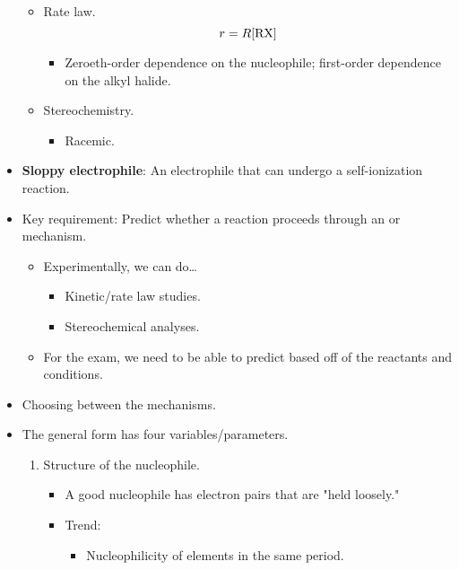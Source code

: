 \documentclass[../notes.tex]{subfiles}
\begin{document}
\begin{itemize}
\begin{itemize}
\begin{itemize}
        \end{itemize}
        \item Rate law.
        \begin{equation*}
            r = R[\ce{RX}]
        \end{equation*}
        \begin{itemize}
            \item Zeroeth-order dependence on the nucleophile; first-order dependence on the alkyl halide.
        \end{itemize}
        \item Stereochemistry.
        \begin{itemize}
            \item Racemic.
        \end{itemize}
    \end{itemize}
    \item \textbf{Sloppy electrophile}: An electrophile that can undergo a self-ionization reaction.
    \item Key requirement: Predict whether a reaction proceeds through an  or  mechanism.
    \begin{itemize}
        \item Experimentally, we can do\dots
        \begin{itemize}
            \item Kinetic/rate law studies.
            \item Stereochemical analyses.
        \end{itemize}
        \item For the exam, we need to be able to predict based off of the reactants and conditions.
    \end{itemize}
    \item Choosing between the mechanisms.
    \item The general form has four variables/parameters.
    \begin{enumerate}
        \item Structure of the nucleophile.
        \begin{itemize}
            \item A good nucleophile has electron pairs that are "held loosely."
            \item Trend:
            \begin{itemize}
                \item Nucleophilicity of elements in the same period.
                \begin{equation*}

\end{equation*}
\end{itemize}
\end{itemize}
\end{enumerate}
\end{itemize}
\end{document}
